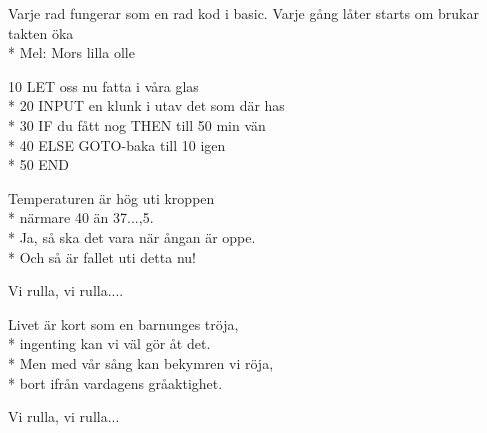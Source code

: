 \begin{SongText}
    \begin{SongInfo}
        Varje rad fungerar som en rad kod i basic.
        Varje gång låter starts om brukar takten öka\\*%
        Mel: Mors lilla olle
    \end{SongInfo}
    \begin{SongVerse}
        10 LET oss nu fatta i våra glas\\*%
        20 INPUT en klunk i utav det som där has\\*%
        30 IF du fått nog THEN till 50 min vän\\*%
        40 ELSE GOTO-baka till 10 igen\\*%
        50 END
    \end{SongVerse}
\end{SongText}
\begin{SongText}[Temperaturen]
    \begin{SongVerse}
        Temperaturen är hög uti kroppen\\*%
        närmare 40 än 37...,5.\\*%
        Ja, så ska det vara när ångan är oppe.\\*%
        Och så är fallet uti detta nu!
    \end{SongVerse}
    \begin{SongVerse}
        Vi rulla, vi rulla....
    \end{SongVerse}
    \begin{SongVerse}
        Livet är kort som en barnunges tröja,\\*%
        ingenting kan vi väl gör åt det.\\*%
        Men med vår sång kan bekymren vi röja,\\*%
        bort ifrån vardagens gråaktighet.
    \end{SongVerse}
    \begin{SongVerse}
        Vi rulla, vi rulla...
    \end{SongVerse}
\end{SongText}
